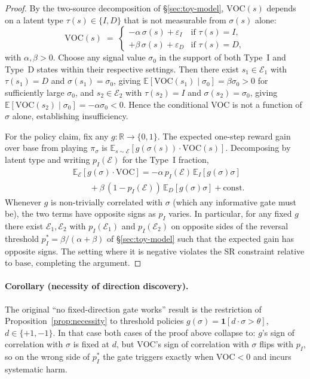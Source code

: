 \begin{proof}
By the two-source decomposition of \S\ref{sec:toy-model},
$\mathrm{VOC}(s)$ depends on a latent type
$\tau(s) \in \{I, D\}$ that is not measurable from $\sigma(s)$
alone:
\[
  \mathrm{VOC}(s) \;=\;
  \begin{cases}
    -\alpha\,\sigma(s) + \varepsilon_I & \text{if } \tau(s) = I,\\
    +\beta\,\sigma(s) + \varepsilon_D & \text{if } \tau(s) = D,
  \end{cases}
\]
with $\alpha, \beta > 0$. Choose any signal value
$\sigma_0$ in the support of both Type~I and Type~D states
within their respective settings. Then there exist
$s_1 \in \mathcal{E}_1$ with $\tau(s_1) = D$ and
$\sigma(s_1) = \sigma_0$, giving
$\mathbb{E}[\mathrm{VOC}(s_1)\mid \sigma_0] = \beta \sigma_0 > 0$
for sufficiently large $\sigma_0$, and
$s_2 \in \mathcal{E}_2$ with $\tau(s_2) = I$ and
$\sigma(s_2) = \sigma_0$, giving
$\mathbb{E}[\mathrm{VOC}(s_2)\mid \sigma_0] =
-\alpha \sigma_0 < 0$. Hence the conditional VOC is not a
function of $\sigma$ alone, establishing insufficiency.

For the policy claim, fix any $g : \mathbb{R} \to \{0, 1\}$.
The expected one-step reward gain over base from playing
$\pi_\sigma$ is
$\mathbb{E}_{s \sim \mathcal{E}}[g(\sigma(s)) \cdot \mathrm{VOC}(s)]$.
Decomposing by latent type and writing $p_I(\mathcal{E})$ for
the Type~I fraction,
\begin{align*}
&\mathbb{E}_{\mathcal{E}}[g(\sigma) \cdot \mathrm{VOC}]
= -\alpha\, p_I(\mathcal{E})\, \mathbb{E}_I[g(\sigma)\sigma] \\
&\qquad + \beta\,(1 - p_I(\mathcal{E}))\, \mathbb{E}_D[g(\sigma)\sigma] + \mathrm{const}.
\end{align*}
Whenever $g$ is non-trivially correlated with $\sigma$ (which
any informative gate must be), the two terms have opposite
signs as $p_I$ varies. In particular, for any fixed $g$ there
exist $\mathcal{E}_1, \mathcal{E}_2$ with $p_I(\mathcal{E}_1)$
and $p_I(\mathcal{E}_2)$ on opposite sides of the reversal
threshold $p_I^* = \beta/(\alpha+\beta)$ of \S\ref{sec:toy-model}
such that the expected gain has opposite signs. The setting
where it is negative violates the SR constraint relative to
$\mathrm{base}$, completing the argument.
\end{proof}

\paragraph{Corollary (necessity of direction discovery).}
The original ``no fixed-direction gate works'' result is the
restriction of Proposition~\ref{prop:necessity} to threshold
policies $g(\sigma) = \mathbf{1}[d \cdot \sigma > \theta]$,
$d \in \{+1, -1\}$. In that case both cases of the proof above
collapse to: $g$'s sign of correlation with $\sigma$ is fixed at
$d$, but $\mathrm{VOC}$'s sign of correlation with $\sigma$
flips with $p_I$, so on the wrong side of $p_I^*$ the gate
triggers exactly when $\mathrm{VOC} < 0$ and incurs systematic
harm.

